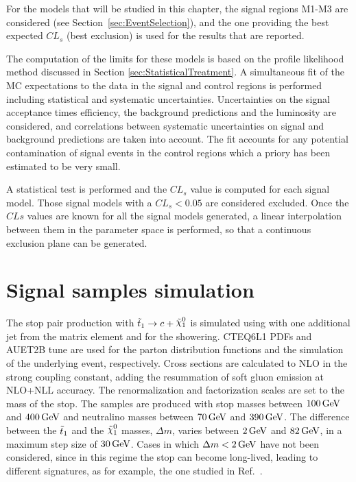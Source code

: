 For the models that will be studied in this chapter, the signal regions M1-M3 are considered (see Section~\ref{sec:EventSelection}), and the one providing the best expected $CL_s$ (best exclusion) is used for the results that are reported.

The computation of the limits for these models is based on the profile likelihood method discussed in Section \ref{sec:StatisticalTreatment}.
A simultaneous fit of the MC expectations to the data in the signal and control regions is performed including statistical and systematic uncertainties.
Uncertainties on the signal acceptance times efficiency, the background predictions and the luminosity are considered, and correlations between systematic uncertainties on signal and background predictions are taken into account.
The fit accounts for any potential contamination of signal events in the control regions which a priory has been estimated to be very small.

A statistical test is performed and the $CL_s$ value is computed for each signal model.
Those signal models with a $CL_s<0.05$ are considered excluded.
Once the $CLs$ values are known for all the signal models generated, a linear interpolation between them in the parameter space is performed, so that a continuous exclusion plane can be generated.


\section{Signal samples simulation}
    \label{sec:SignalSimulation}

The stop pair production with $\stoptocharm$ is simulated using {\madgraph} with one additional jet from the matrix element and  for the showering.
CTEQ6L1 PDFs and AUET2B tune are used for the parton distribution functions and the simulation of the underlying event, respectively.
Cross sections are calculated to NLO in the strong coupling constant, adding the resummation of soft gluon emission at NLO+NLL accuracy.
The renormalization and factorization scales are set to the mass of the stop.
The samples are produced with stop masses between $\unit[100]{GeV}$ and $\unit[400]{GeV}$ and neutralino masses between $\unit[70]{GeV}$ and $\unit[390]{GeV}$.
The difference between the $\tilde{t}_1$ and the $\ninoone$ masses, $\Delta m$, varies between $\unit[2]{GeV}$ and $\unit[82]{GeV}$, in a maximum step size of $\unit[30]{GeV}$. Cases in which $\Delta m < \unit[2]{GeV}$ have not been considered, since in this regime the stop can become long-lived, leading to different signatures, as for example, the one studied in Ref.~\cite{Johansen:2010ac}.

